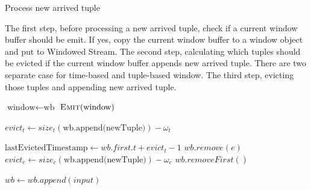 \begin{algorithm}
\caption{Process new arrived tuple}
\label{algorithm:newTuple}
The first step, before processing a new arrived tuple, check if a current window buffer should be emit. If yes, copy the current window buffer to a window object and put to Windowed Stream. The second step, calculating which tuples should be evicted if the current window buffer appends new arrived tuple. There are two separate case for time-based and tuple-based window. The third step, evicting those tuples and appending new arrived tuple.


\algrenewcommand{}
\algrenewcommand{}
  \begin{algorithmic}[1]
    
    		\State $\textrm{window} \gets \textrm{wb}$
    		\State $\textsc{Emit}(\textrm{window})$
    \EndIf
    
    		\State $ evict_t \gets size_t (\textrm{wb.append(newTuple)}) - \omega_t$
    
    			\State $ \textrm{lastEvictedTimestamp} \gets wb.first.t + evict_t - 1$
    					\State $wb.remove(e)$
    				\EndIf
    			\EndFor
    		\EndIf
    \Else
    		\State $evict_c \gets size_c(\textrm{wb.append(newTuple)}) - \omega_c$
    				\State $wb.removeFirst()$
    			\EndFor
    		\EndIf
    \EndIf
    
   	\State $wb \gets wb.append(input)$
    

    
    \EndProcedure
  \end{algorithmic}

\end{algorithm}

